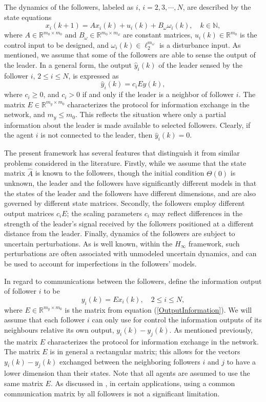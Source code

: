 \documentclass[a4paper,10pt,onecolumn]{article}
\begin{document}
The dynamics of the followers, labeled as $i$, $i=2,3,\cdots,N$, are
described by the 
state equations
\begin{equation}\label{FollowerDynamics}
x_{i}(k+1)=Ax_{i}(k)+u_{i}(k)+B_{\omega}\omega_{i}(k), \quad k\in \mathbb{N},
\end{equation}
where $A\in \mathbb{R}^{m_{0}\times m_{0}}$ and $B_{\omega}\in \mathbb{R}^{m_{0}\times m_{\omega}}$ are constant matrices,
 $u_{i}(k)\in \mathbb{R}^{m_{0}}$ is the control input to be designed, and
 $\omega_{i}(k)\in \ell_2^{m_{\omega}}$ is a disturbance input.
As mentioned, we assume that some of the followers are able to sense the
output of the leader. In a general form, the output $\hat{y}_{i}(k)$ of the
 leader sensed by the follower $i$, $2\leq i \leq N$, is expressed as
\begin{equation}\label{OutputInformation}
\hat{y}_{i}(k)=c_{i}Ey(k),
\end{equation}
where $c_{i}\geq 0$, and $c_{i}>0$ if and only if the leader is a neighbor
of follower $i$. The matrix $E\in \mathbb{R}^{m_{y}\times m_{0}}$ characterizes
the protocol for information exchange in the network, and
$m_{y}\leq m_{0}$. This reflects the situation where only a partial
information  about the leader is made available to selected followers.
Clearly, if the agent $i$ is not connected to the
leader, then $\hat{y}_{i}(k)=0$.

The present framework has several features that distinguish it from similar
problems considered in the literature. Firstly, while we assume
that the state matrix $\hat{A}$ is known to the
followers, though the initial condition $\Theta(0)$ is unknown, the leader
and the followers have significantly different models in that the states of
the leader and the followers have different dimensions, and are also
governed by different state matrices. Secondly, the followers employ different
output matrices $c_iE$; the scaling parameters $c_i$ may reflect
differences in the strength of the leader's signal received by the
followers positioned at a different distance from the leader. Finally,
dynamics of the followers are subject to uncertain perturbations. As is
well known, within the $H_\infty$
framework, such perturbations are often associated with unmodeled uncertain
dynamics, and can be used to account for imperfections in the followers' models.

In regard to communications between the followers, define the information
output of follower $i$ to be
\[
y_{i}(k)=Ex_{i}(k), \quad 2\leq i \leq N,
\]
where  $E\in \mathbb{R}^{m_{y}\times m_{0}}$ is the matrix from equation
(\ref{OutputInformation}). We will assume that each follower $i$ can only
use for control the information outputs of its neighbours relative its own
output, $y_{i}(k)-y_{j}(k)$.
As mentioned previously, the matrix $E$
characterizes the protocol for information exchange in the network. The
matrix $E$ is in general a rectangular matrix; this allows for the vectors
$y_{i}(k)-y_{j}(k)$ exchanged between the neighboring followers $i$ and $j$
to have a lower dimension than their states. Note that all agents are
assumed to use the same matrix $E$. As discussed in \cite{U7b}, in certain
applications, using a common communication matrix by all followers is not a
significant limitation. 
\end{document}
